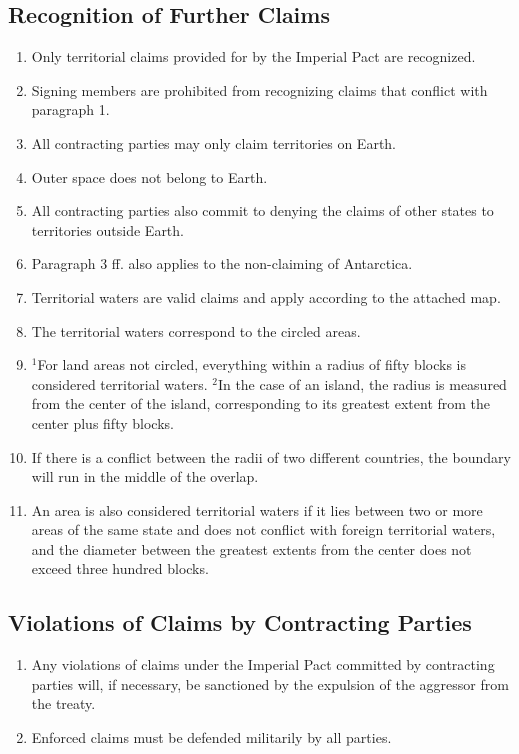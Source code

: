 \documentclass{article}
\begin{document}
\subsection{Recognition of Further Claims}
\begin{enumerate}[(1)]
    \item Only territorial claims provided for by the Imperial Pact are recognized.
    \item Signing members are prohibited from recognizing claims that conflict with paragraph 1.
    \item All contracting parties may only claim territories on Earth.
    \item Outer space does not belong to Earth.
    \item All contracting parties also commit to denying the claims of other states to territories outside Earth.
    \item Paragraph 3 ff. also applies to the non-claiming of Antarctica.
    \item Territorial waters are valid claims and apply according to the attached map.
    \item The territorial waters correspond to the circled areas.
    \item ${^1}$For land areas not circled, everything within a radius of fifty blocks is considered territorial waters. ${^2}$In the case of an island, the radius is measured from the center of the island, corresponding to its greatest extent from the center plus fifty blocks.
    \item If there is a conflict between the radii of two different countries, the boundary will run in the middle of the overlap.
    \item An area is also considered territorial waters if it lies between two or more areas of the same state and does not conflict with foreign territorial waters, and the diameter between the greatest extents from the center does not exceed three hundred blocks.
\end{enumerate}

\subsection{Violations of Claims by Contracting Parties}
\begin{enumerate}[(1)]
    \item Any violations of claims under the Imperial Pact committed by contracting parties will, if necessary, be sanctioned by the expulsion of the aggressor from the treaty.
    \item Enforced claims must be defended militarily by all parties.
\end{enumerate}
\end{document}
